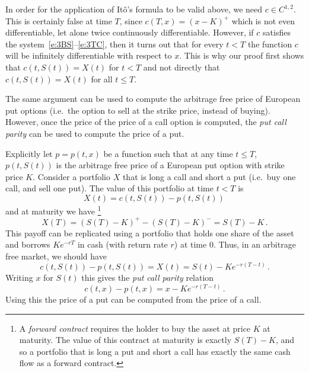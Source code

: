\begin{remark}
  In order for the application of It\^o's formula to be valid above, we need $c \in C^{1,2}$.
  This is certainly false at time $T$, since $c(T, x) = (x - K)^+$ which is not even differentiable, let alone twice continuously differentiable.
  However, if $c$ satisfies the system~\eqref{e:3BS}--\eqref{e:3TC}, then it turns out that for every $t < T$ the function $c$ will be infinitely differentiable with respect to $x$.
  This is why our proof first shows that $c(t, S(t)) = X(t)$ for $t < T$ and not directly that $c(t, S(t)) = X(t)$ for all $t \leq T$.
\end{remark}
\begin{remark}
  The same argument can be used to compute the arbitrage free price of European put options (i.e.\ the option to sell at the strike price, instead of buying).
  However, once the price of the price of a call option is computed, the \emph{put call parity} can be used to compute the price of a put.

  Explicitly let $p = p(t, x)$ be a function such that at any time $t \leq T$, $p(t, S(t))$ is the arbitrage free price of a European put option with strike price $K$.
  Consider a portfolio $X$ that is long a call and short a put (i.e.\ buy one call, and sell one put).
  The value of this portfolio at time $t < T$ is
  \begin{equation*}
    X(t) = c(t, S(t)) - p(t, S(t))\,
  \end{equation*}
  and at maturity we have%
  \footnote{
    A \emph{forward contract} requires the holder to buy the asset at price $K$ at maturity.
    The value of this contract at maturity is exactly $S(T) - K$, and so a portfolio that is long a put and short a call has exactly the same cash flow as a forward contract.%
  }
  \begin{equation*}
    X(T) = (S(T) - K)^+ - (S(T) - K)^- = S(T) - K\,.
  \end{equation*}
  This payoff can be replicated using a portfolio that holds one share of the asset and borrows $K e^{-rT}$ in cash (with return rate $r$) at time $0$.
  Thus, in an arbitrage free market, we should have
  \begin{equation*}
    c(t, S(t)) - p(t, S(t)) = X(t) = S(t) - K e^{-r(T-t)}\,.
  \end{equation*}
  Writing $x$ for $S(t)$ this gives the \emph{put call parity} relation
  \begin{equation*}
    c(t, x) - p(t, x) = x - K e^{-r(T-t)}\,.
  \end{equation*}
  Using this the price of a put can be computed from the price of a call.
\end{remark}

